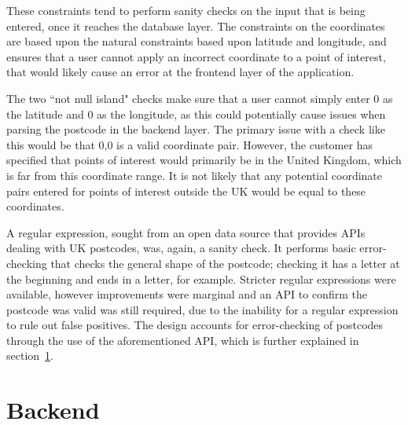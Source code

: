 These constraints tend to perform sanity checks on the input that is being entered, once it reaches the database layer. The constraints on the coordinates are based upon the natural constraints based upon latitude and longitude, and ensures that a user cannot apply an incorrect coordinate to a point of interest, that would likely cause an error at the frontend layer of the application.

The two ``not null island" checks make sure that a user cannot simply enter 0 as the latitude and 0 as the longitude, as this could potentially cause issues when parsing the postcode in the backend layer. The primary issue with a check like this would be that 0,0 is a valid coordinate pair. However, the customer has specified that points of interest would primarily be in the United Kingdom, which is far from this coordinate range. It is not likely that any potential coordinate pairs entered for points of interest outside the UK would be equal to these coordinates.

A regular expression, sought from an open data source that provides APIs dealing with UK postcodes\cite{PostcodeRegex}, was, again, a sanity check. It performs basic error-checking that checks the general shape of the postcode; checking it has a letter at the beginning and ends in a letter, for example. Stricter regular expressions were available, however improvements were marginal and an API to confirm the postcode was valid was still required, due to the inability for a regular expression to rule out false positives. The design accounts for error-checking of postcodes through the use of the aforementioned API, which is further explained in section~\ref{sec:backend}. 


\section{Backend}
\label{sec:backend}


